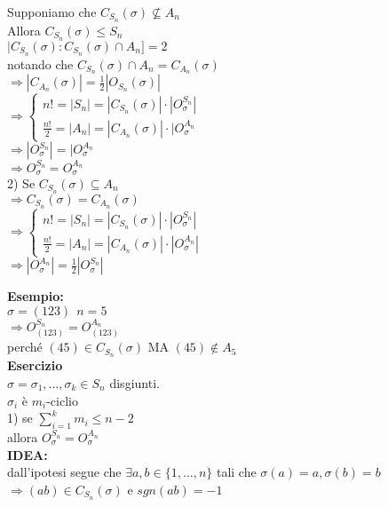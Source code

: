 \documentclass[12px]{article}
\begin{document}
	 \begin{dimo}
		 Supponiamo che $C_{S_n}(\sigma)\not\subseteq A_n$\\
		 Allora  $C_{S_n}(\sigma)\leq S_n$\\
		 $|C_{S_n}(\sigma):C_{S_n}(\sigma)\cap A_n] = 2$\\
		 notando che $C_{S_n}(\sigma)\cap A_n = C_{A_n}(\sigma)$\\
		 $ \Rightarrow |C_{A_n}(\sigma)| = \frac 12 |O_{S_n}(\sigma)|$ \\
		 $ \Rightarrow \begin{cases}
			 n! = |S_n| = |C_{S_n}(\sigma)|\cdot |O_\sigma^{S_n}|\\
			 \frac{n!}2 = |A_n| = |C_{A_n}(\sigma)|\cdot|O_\sigma^{A_n}
		 \end{cases}$ \\
	 $ \Rightarrow |O_\sigma^{S_n}| = |O_\sigma^{A_n}$\\
	 $ \Rightarrow O_\sigma ^{S_n}= O_\sigma^{A_n}$ \\
	 2) Se $C_{S_n}(\sigma)\subseteq A_n$\\
	 $ \Rightarrow C_{S_n}(\sigma) = C_{A_n}(\sigma)$\\
	 $ \Rightarrow \begin{cases}
		 n! = |S_n| = |C_{S_n}(\sigma)|\cdot|O_\sigma^{S_n}|\\
		 \frac{n!}2 = |A_n| = |C_{A_n}(\sigma)|\cdot|O_\sigma^{A_n}|

	 \end{cases}$ \\
	 $ \Rightarrow |O_\sigma ^{A_n}| = \frac 12 |O_\sigma^{S_n}|$
		
	\end{dimo}
	\textbf{Esempio:}\\
	$\sigma = (123) \ \ n = 5$\\
	$ \Rightarrow O^{S_n}_{(123)} = O^{A_n}_{(123)}$\\
	perché $(45)\in C_{S_n}(\sigma)$ MA $(45)\not\in A_5$\\
	\textbf{Esercizio}\\
	$\sigma = \sigma_1,\ldots, \sigma_k\in S_n$ disgiunti.\\
	$\sigma_i$ è $m_i$-ciclio\\
	1) se $\sum^k_{i=1}m_i\leq n-2$\\
	allora $O_\sigma^{S_n} = O_\sigma^{A_n}$ \\
\textbf{IDEA:}\\
dall'ipotesi segue che $\exists a,b\in\{1,\ldots,n\}$ tali che $\sigma(a) = a, \sigma (b) = b$\\
$ \Rightarrow (ab)\in C_{S_n}(\sigma)$ e $sgn(ab) = -1$
	
\end{document}
